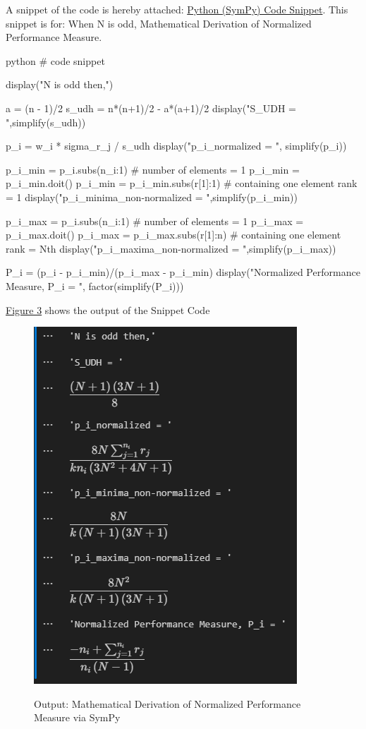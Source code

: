 \documentclass[man,floatsintext]{apa7}
\begin{document}
A snippet of the code is hereby attached: \hyperref[code:snippet_odd_performance_measure]{Python (SymPy) Code Snippet}. This snippet is for: When N is odd, Mathematical Derivation of Normalized Performance Measure.

 	\label{code:snippet_odd_performance_measure}
\begin{mintedbox}{python}
	# code snippet
	
	display("N is odd then,")
	
	a = (n - 1)/2
	s_udh = n*(n+1)/2 - a*(a+1)/2
	display("S_UDH = ",simplify(s_udh))
	
	p_i = w_i * sigma_r_j / s_udh
	display("p_i_normalized = ", simplify(p_i))
	
	p_i_min = p_i.subs({n_i:1}) # number of elements = 1
	p_i_min = p_i_min.doit()
	p_i_min = p_i_min.subs({r[1]:1}) # containing one element rank = 1
	display("p_i_minima_non-normalized = ",simplify(p_i_min))
	
	p_i_max = p_i.subs({n_i:1}) # number of elements = 1
	p_i_max = p_i_max.doit()
	p_i_max = p_i_max.subs({r[1]:n}) # containing one element rank = Nth
	display("p_i_maxima_non-normalized = ",simplify(p_i_max))
	
	P_i = (p_i - p_i_min)/(p_i_max - p_i_min)
	display("Normalized Performance Measure, P_i = ", factor(simplify(P_i)))
\end{mintedbox}

\hyperref[fig:output-mathematical-validation]{Figure 3} shows the output of the Snippet Code
\begin{figure}[!htb]
	\caption{Output: Mathematical Derivation of Normalized Performance Measure via SymPy}
	\centering
	\includegraphics [scale=1]{images/output-mathematical-validation.png}
	\label{fig:output-mathematical-validation}
\end{figure}
\end{document}
